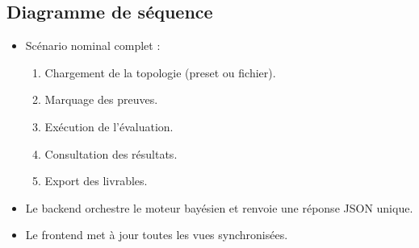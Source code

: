\documentclass[12pt,a4paper]{article}
\newcommand{\forcereset}[1]{%
    \needspace{#1\baselineskip}%
}
\begin{document}
\newpage
\subsection{Diagramme de séquence}
\forcereset{10}
\begin{itemize}[leftmargin=1.2cm, itemsep=0.2\baselineskip]
    \item Scénario nominal complet :
        \begin{enumerate}
            \item Chargement de la topologie (preset ou fichier).
            \item Marquage des preuves.
            \item Exécution de l'évaluation.
            \item Consultation des résultats.
            \item Export des livrables.
        \end{enumerate}
    \item Le backend orchestre le moteur bayésien et renvoie une réponse JSON unique.
    \item Le frontend met à jour toutes les vues synchronisées.
\end{itemize}
\end{document}

